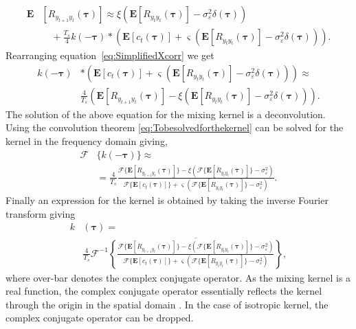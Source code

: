 \documentclass[10pt,twocolumn,twoside]{IEEEtran}
\begin{document}
\begin{align}\label{eq:SimplifiedXcorr}
	\mathbf{E}&[R_{y_{t+1}y_t}(\boldsymbol{\tau})] \approx \xi\left(\mathbf{E}[ R_{y_ty_t}(\boldsymbol{\tau})] - \sigma_{\varepsilon}^2 \delta(\boldsymbol{\tau})\right) \nonumber \\
	&\quad+ \frac{T_s}{4} k(-\boldsymbol\tau) \ast (\mathbf{E}\left[c_t(\boldsymbol\tau)\right] + \varsigma (\mathbf{E}\left[R_{y_ty_t}(\boldsymbol\tau)\right] - \sigma_{\varepsilon}^2 \delta(\boldsymbol\tau))).
\end{align}
Rearranging equation~\eqref{eq:SimplifiedXcorr} we get
\begin{align} \label{eq:Tobesolvedforthekernel}
	k(-\boldsymbol\tau) & \ast (\mathbf{E}\left[c_t(\boldsymbol\tau)\right] + \varsigma (\mathbf{E}\left[R_{y_ty_t}(\boldsymbol\tau)\right] - \sigma_{\varepsilon}^2 \delta(\boldsymbol\tau))) \approx  \nonumber \\
	& \frac{4}{T_s}(\mathbf{E}[R_{y_{t+1}y_t}(\boldsymbol{\tau})] - \xi\left(\mathbf{E}[ R_{y_ty_t}(\boldsymbol{\tau})] - \sigma_{\varepsilon}^2 \delta(\boldsymbol{\tau})\right)).
\end{align}
The solution of the above equation for the mixing kernel is a deconvolution. Using the convolution theorem \eqref{eq:Tobesolvedforthekernel} can be solved for the kernel in the frequency domain giving,
\begin{align}
	\mathcal{F}&\{k(-\boldsymbol\tau)\} \approx  \nonumber \\
	&= \frac{4}{T_s} \frac{\mathcal{F}\{\mathbf{E}[R_{y_{t+1}y_t}(\boldsymbol{\tau})]\} - \xi\left(\mathcal{F}\{\mathbf{E}[ R_{y_ty_t}(\boldsymbol{\tau})]\} - \sigma_{\varepsilon}^2 \right)} {\mathcal{F}\{\mathbf{E}\left[c_t(\boldsymbol\tau)\right]\} + \varsigma (\mathcal{F}\{\mathbf{E}\left[R_{y_ty_t}(\boldsymbol\tau)\right]\} - \sigma_{\varepsilon}^2 )}.  \label{eq:Fourier_TF_of_Kernel}
\end{align} 
Finally an expression for the kernel is obtained by taking the inverse Fourier transform giving 
\begin{align}\label{eq:EM-Fourier_TF_of_Kernel}   
	k&(\boldsymbol\tau) = \nonumber \\
	&\frac{4}{T_s}\mathcal{F}^{-1}\overline{\left\{ \frac{\mathcal{F}\{\mathbf{E}[R_{y_{t+1}y_t}(\boldsymbol{\tau})]\} - \xi\left(\mathcal{F}\{\mathbf{E}[ R_{y_ty_t}(\boldsymbol{\tau})]\} - \sigma_{\varepsilon}^2 \right)}{\mathcal{F}\{\mathbf{E}\left[c_t(\boldsymbol\tau)\right]\} + \varsigma (\mathcal{F}\{\mathbf{E}\left[R_{y_ty_t}(\boldsymbol\tau)\right]\} - \sigma_{\varepsilon}^2 )} \right\}},
\end{align}
 where over-bar denotes the complex conjugate operator. As the mixing kernel is a real function, the complex conjugate operator essentially reflects the kernel through the origin in the spatial domain \cite{Bracewell2000}. In the case of isotropic kernel, the complex conjugate operator can be dropped. 
\end{document}
